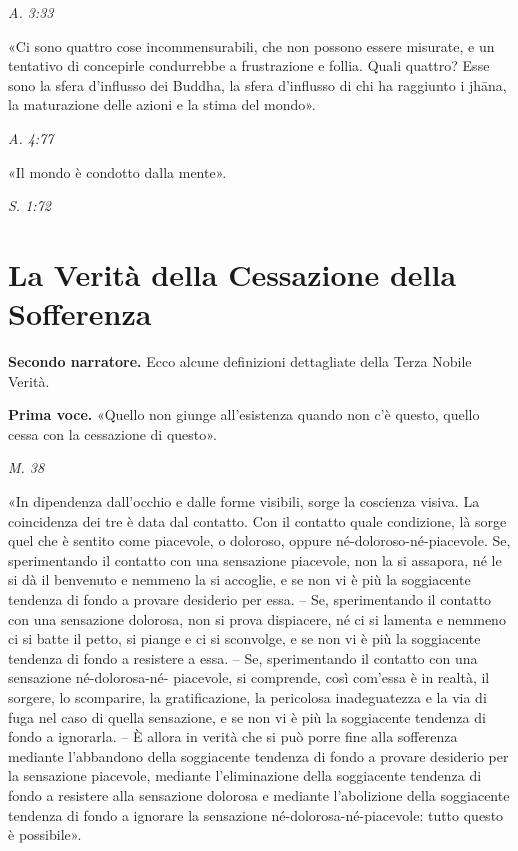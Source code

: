 \emph{A. 3:33}


«Ci sono quattro cose incommensurabili, che non possono essere misurate,
e un tentativo di concepirle condurrebbe a frustrazione e follia. Quali
quattro? Esse sono la sfera d’influsso dei Buddha, la sfera d’influsso
di chi ha raggiunto i jhāna, la maturazione delle azioni e la stima del
mondo».


\emph{A. 4:77}


«Il mondo è condotto dalla mente».


\emph{S. 1:72}


\hypertarget{x-la-verità-della-cessazione-della-sofferenza}{\section*{La Verità della Cessazione della Sofferenza}}
\textbf{Secondo narratore.} Ecco alcune definizioni dettagliate della Terza
Nobile Verità.


\textbf{Prima voce.} «Quello non giunge all’esistenza quando non c’è questo,
quello cessa con la cessazione di questo».


\emph{M. 38}


«In dipendenza dall’occhio e dalle forme visibili, sorge la coscienza
visiva. La coincidenza dei tre è data dal contatto. Con il contatto
quale condizione, là sorge quel che è sentito come piacevole, o
doloroso, oppure né-doloroso-né-piacevole. Se, sperimentando il contatto
con una sensazione piacevole, non la si assapora, né le si dà il
benvenuto e nemmeno la si accoglie, e se non vi è più la soggiacente
tendenza di fondo a provare desiderio per essa. – Se, sperimentando il
contatto con una sensazione dolorosa, non si prova dispiacere, né ci si
lamenta e nemmeno ci si batte il petto, si piange e ci si sconvolge, e
se non vi è più la soggiacente tendenza di fondo a resistere a essa. –
Se, sperimentando il contatto con una sensazione né-dolorosa-né-
piacevole, si comprende, così com’essa è in realtà, il sorgere, lo
scomparire, la gratificazione, la pericolosa inadeguatezza e la via di
fuga nel caso di quella sensazione, e se non vi è più la soggiacente
tendenza di fondo a ignorarla. – È allora in verità che si può porre
fine alla sofferenza mediante l’abbandono della soggiacente tendenza di
fondo a provare desiderio per la sensazione piacevole, mediante
l’eliminazione della soggiacente tendenza di fondo a resistere alla
sensazione dolorosa e mediante l’abolizione della soggiacente tendenza
di fondo a ignorare la sensazione né-dolorosa-né-piacevole: tutto questo
è possibile».


